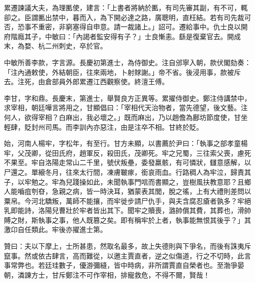 \begin{pinyinscope}
 累遷諫議大夫，為理匭使，建言：「上書者將納於匭，有司先審其副，有不可，輒卻之。臣謂匭出禁中，暮而入，為下開必達之路，廣聰明，直枉結。若有司先裁可否，恐事不重密，非窮塞得自申意。請一裁諸上。」詔可。遷給事中。仇士良以開府階廕其子，中敏曰：「內謁者監安得有子？」士良慚恚。繇是復棄官去。開成末，為婺、杭二州刺史，卒於官。



 中敏所善李款，字言源。長慶初第進士，為侍御史。注自邠寧入朝，款伏閣劾奏：「注內通敕使，外結朝臣，往來兩地，卜射賕謝。」帝不省。後浸用事，款被斥去。注死，由倉部員外郎累遷江西觀察使。終澶王傅。



 李甘，字和鼎。長慶末，第進士，舉賢良方正異等。累擢侍御史。鄭注侍講禁中，求宰相，朝廷嘩言將用之，甘顯倡曰：「宰相代天治物者，當先德望，後文藝。注何人，欲得宰相？白麻出，我必壞之。」既而麻出，乃以趙儋為鄜坊節度使，甘坐輕肆，貶封州司馬。而李訓內亦惡注，由是注卒不相。甘終於貶。



 始，河南人楊牢，字松年，有至行。甘方未顯，以書薦於尹曰：「執事之部孝童楊牢，父茂卿，從田氏府，趙軍反，殺田氏，茂卿死。牢之兄蜀，三往索父喪，慮死不果至。牢自洛陽走常山二千里，號伏叛壘，委發羸骸，有可憐狀，讎意感解，以尸還之。單縗冬月，往來太行間，凍膚皸瘃，銜哀雨血。行路稠人為牢泣，歸責其子，以牢勉之。牢為兒踐操如此，未聞執事門唁而書顯之，豈樹風扶教意耶？且鄉人能嚙疽刳昚，急親之病，皆一時決耳，猶蒙表其閭，脫之徭，上有大禮則差問以粟帛。今河北驕叛，萬師不能攘，而牢徙步請尸仇手，與夫含腐忍瘡者孰多？牢絕乳即能詩，洛陽兒曹壯於牢者皆出其下。聞牢之贖喪，潞帥償其費，其葬也，滑帥賻之財，斯執事之事，他人既篡之矣。即有稱牢於上者，執事能無恨其後乎？」其激卬自任類此。牢後亦擢進士第。



 贊曰：夫以下摩上，士所甚患，然取名最多，故上失德則與下爭名，而後有誅夷斥竄事。然或依古肆言，高而難從，以邀主賈直者，逆之似傷道，行之不切時，此言事常弊也。若廷珪數子，優游彌縫，皆中時病，非所謂賈直自榮者也。至渤爭晏朝，潾諫方士，甘斥鄭注不可作宰相，排寵救危，不得不爾，賢哉！



\end{pinyinscope}